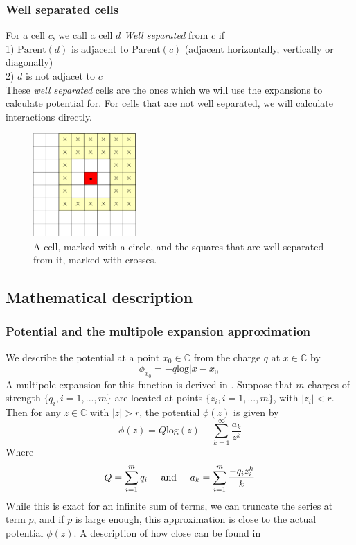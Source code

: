 \documentclass[pdftex,twoside,a4paper]{report}
\newcommand{\bcen}{\begin{center}}
\newcommand{\ecen}{\end{center}}
\begin{document}
\subsubsection{Well separated cells}
\label{sec:well_sep}
For a cell $c$, we call a cell $d$ \emph{Well separated} from $c$ if\\
1) $\text{Parent}(d)$ is adjacent to $\text{Parent}(c)$ (adjacent horizontally, vertically or diagonally)\\
2) $d$ is not adjacet to $c$\\
\newline
These \emph{well separated} cells are the ones which we will use the expansions to calculate potential for. For cells that are not well separated, we will calculate interactions directly.
\begin{figure}[H]
\bcen \includegraphics[width=0.35\textwidth]{figures/wellsep.pdf} \ecen
\caption{A cell, marked with a circle, and the squares that are well separated from it, marked with crosses.}
\end{figure}

\subsection{Mathematical description}
\label{sec:fma_math}
\subsubsection{Potential and the multipole expansion approximation}
We describe the potential at a point $x_0 \in \mathbb{C}$ from the charge $q$ at $x \in \mathbb{C}$ by
\begin{equation}
\phi_{x_0} = -q\text{log}{|x - x_0|}
\label{eq:potential}
\end{equation}
A multipole expansion for this function is derived in \cite{greengard:315}. Suppose that $m$ charges of strength $\{q_i,i=1,...,m\}$ are located at points $\{z_i, i=1,...,m\}$, with $|z_i| < r$. Then for any $z \in \mathbb{C}$ with $|z| > r$, the potential $\phi(z)$ is given by
\begin{equation}
\phi(z) = Q \text{log}(z) + \sum_{k=1} ^{\infty} \frac{a_k}{z^k}
\label{eq:multipole_expansion}
\end{equation}
Where
\begin{equation}
Q = \sum_{i=1} ^m q_i 
\hspace{0.5cm} \text{and} \hspace{0.5cm}
a_k = \sum_{i=1} ^m \frac{-q_i z^k _i}{k}
\end{equation}
While this is exact for an infinite sum of terms, we can truncate the series at term $p$, and if $p$ is large enough, this approximation is close to the actual potential $\phi(z)$. A description of how close can be found in \cite{greengard:315}
\end{document}
